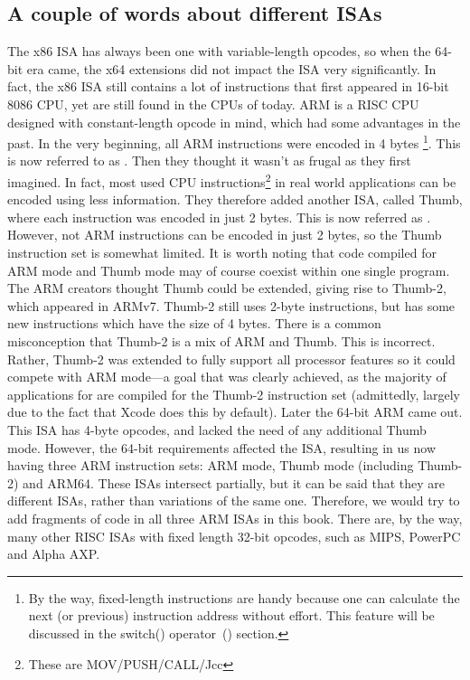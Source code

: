 %
%
%

\subsection{A couple of words about different \ac{ISA}s}
The x86 \ac{ISA} has always been one with variable-length opcodes, so when the 64-bit era came, the x64 extensions did not impact the \ac{ISA} very significantly. In fact, the x86 \ac{ISA} still contains a lot of instructions that first appeared in 16-bit 8086 CPU, yet are still found in the CPUs of today.
ARM is a \ac{RISC} \ac{CPU} designed with constant-length opcode in mind, which had some advantages in the past.
In the very beginning, all ARM instructions were encoded in 4 bytes%
\footnote{
By the way, fixed-length instructions are handy because one can calculate the next (or previous) 
instruction address without effort. This feature will be discussed in the switch() operator~() section.
}.
This is now referred to as .
Then they thought it wasn't as frugal as they first imagined.
In fact, most used \ac{CPU} instructions\footnote{These are MOV/PUSH/CALL/Jcc} in real world applications can be encoded using less information.
They therefore added another \ac{ISA}, called Thumb, where each instruction was encoded in just 2 bytes.
This is now referred as .
However, not  ARM instructions can be encoded in just 2 bytes, so the Thumb instruction set is somewhat limited.
It is worth noting that code compiled for ARM mode and Thumb mode may of course coexist within one single program.
The ARM creators thought Thumb could be extended, giving rise to Thumb-2, which appeared in ARMv7.
Thumb-2 still uses 2-byte instructions, but has some new instructions which have the size of 4 bytes.
There is a common misconception that Thumb-2 is a mix of ARM and Thumb. This is incorrect. 
Rather, Thumb-2 was extended to fully support all processor features so it could
compete with ARM mode---a goal that was clearly achieved, as the majority of applications for \idevices are compiled for the Thumb-2 instruction set (admittedly, largely due to the fact that Xcode does this by default).
Later the 64-bit ARM came out. This \ac{ISA} has 4-byte opcodes, and lacked the need of any additional Thumb mode.
However, the 64-bit requirements affected the \ac{ISA}, resulting in us now having three ARM instruction sets: ARM mode, Thumb mode (including Thumb-2) and ARM64.
These \ac{ISA}s intersect partially, but it can be said that they are different \ac{ISA}s, rather than variations of the same one.
Therefore, we would try to add fragments of code in all three ARM \ac{ISA}s in this book.
%
%
%
There are, by the way, many other \ac{RISC} \ac{ISA}s with fixed length 32-bit opcodes, such as MIPS, PowerPC and Alpha AXP.

